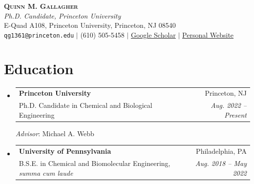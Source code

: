 \documentclass[letterpaper,11pt]{article}
\makeatletter
\newcommand{\resumeSubheading}[4]{
  \vspace{-2pt}\item
    \begin{tabular*}{0.97\textwidth}[t]{l@{\extracolsep{\fill}}r}
      \textbf{#1} & #2 \\
      #3 & \textit{#4} \\
    \end{tabular*}
}
\newcommand{\resumeSubHeadingListStart}{\begin{itemize}[leftmargin=0.15in, label={}]}
\newcommand{\resumeSubHeadingListEnd}{\end{itemize}}
\makeatother
\begin{document}
\begin{center}
    \textbf{\huge \scshape Quinn M. Gallagher}\\
    \vspace{3pt}
    \textit{\large Ph.D. Candidate, Princeton University}\\
    E-Quad A108, Princeton University, Princeton, NJ 08540\\
    \texttt{qg1361@princeton.edu} $|$ (610) 505-5458 $|$ \href{https://scholar.google.com/citations?hl=en&user=9t3fzmUAAAAJ&view_op=list_works&sortby=pubdate}{Google Scholar} $|$ \href{https://qgallagher.github.io}{Personal Website}
\end{center}


\section{Education}

  \resumeSubHeadingListStart
    \resumeSubheading
      {Princeton University}{Princeton, NJ}
      {Ph.D. Candidate in Chemical and Biological Engineering}{Aug. 2022 -- Present}
      \textit{Advisor}: Michael A. Webb
    \resumeSubheading
      {University of Pennsylvania}{Philadelphia, PA}
      {B.S.E. in Chemical and Biomolecular Engineering, \textit{summa cum laude}}{Aug. 2018 -- May 2022}
  \resumeSubHeadingListEnd



\end{document}
